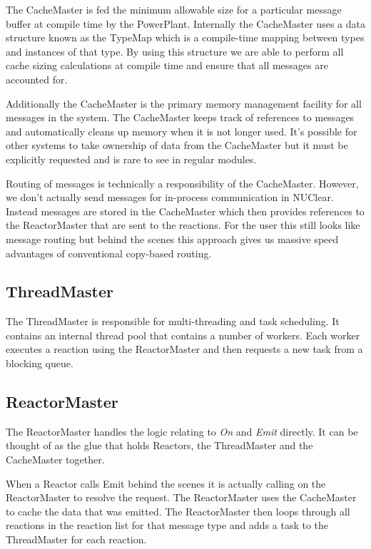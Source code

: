 \documentclass[english,12pt]{scrartcl}
\begin{document}
				The CacheMaster is fed the minimum allowable size for a particular message buffer at compile time by the PowerPlant.
				Internally the CacheMaster uses a data structure known as the TypeMap which is a compile-time mapping between types and instances of that type.
				By using this structure we are able to perform all cache sizing calculations at compile time and ensure that all messages are accounted for.
				
				Additionally the CacheMaster is the primary memory management facility for all messages in the system.
				The CacheMaster keeps track of references to messages and automatically cleans up memory when it is not longer used.
				It's possible for other systems to take ownership of data from the CacheMaster but it must be explicitly requested and is rare to see in regular modules.
				
				Routing of messages is technically a responsibility of the CacheMaster.
				However, we don't actually send messages for in-process communication in NUClear. 
				Instead messages are stored in the CacheMaster which then provides references to the ReactorMaster that are sent to the reactions.
				For the user this still looks like message routing but behind the scenes this approach gives us massive speed advantages of conventional copy-based routing.

			\subsection{ThreadMaster}				
				The ThreadMaster is responsible for multi-threading and task scheduling.
				It contains an internal thread pool that contains a number of workers. 
				Each worker executes a reaction using the ReactorMaster and then requests a new task from a blocking queue.
				
	
			\subsection{ReactorMaster}
				The ReactorMaster handles the logic relating to \emph{On} and \emph{Emit} directly. 
				It can be thought of as the glue that holds Reactors, the ThreadMaster and the CacheMaster together.
				
				When a Reactor calls Emit behind the scenes it is actually calling on the ReactorMaster to resolve the request.
				The ReactorMaster uses the CacheMaster to cache the data that was emitted.
				The ReactorMaster then loops through all reactions in the reaction list for that message type and adds a task to the ThreadMaster for each reaction.
				
\end{document}

